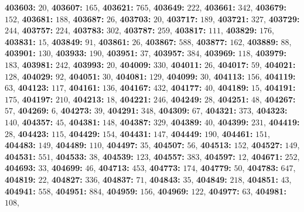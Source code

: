 \textsf{\bfseries 403603:} $20$, \textsf{\bfseries 403607:} $165$, \textsf{\bfseries 403621:} $765$, \textsf{\bfseries 403649:} $222$, \textsf{\bfseries 403661:} $342$, \textsf{\bfseries 403679:} $152$, \textsf{\bfseries 403681:} $188$, \textsf{\bfseries 403687:} $26$, \textsf{\bfseries 403703:} $20$, \textsf{\bfseries 403717:} $189$, \textsf{\bfseries 403721:} $327$, \textsf{\bfseries 403729:} $244$, \textsf{\bfseries 403757:} $224$, \textsf{\bfseries 403783:} $302$, \textsf{\bfseries 403787:} $259$, \textsf{\bfseries 403817:} $111$, \textsf{\bfseries 403829:} $176$, \textsf{\bfseries 403831:} $15$, \textsf{\bfseries 403849:} $91$, \textsf{\bfseries 403861:} $26$, \textsf{\bfseries 403867:} $588$, \textsf{\bfseries 403877:} $162$, \textsf{\bfseries 403889:} $88$, \textsf{\bfseries 403901:} $130$, \textsf{\bfseries 403933:} $190$, \textsf{\bfseries 403951:} $37$, \textsf{\bfseries 403957:} $384$, \textsf{\bfseries 403969:} $118$, \textsf{\bfseries 403979:} $183$, \textsf{\bfseries 403981:} $242$, \textsf{\bfseries 403993:} $20$, \textsf{\bfseries 404009:} $330$, \textsf{\bfseries 404011:} $26$, \textsf{\bfseries 404017:} $59$, \textsf{\bfseries 404021:} $128$, \textsf{\bfseries 404029:} $92$, \textsf{\bfseries 404051:} $30$, \textsf{\bfseries 404081:} $129$, \textsf{\bfseries 404099:} $30$, \textsf{\bfseries 404113:} $156$, \textsf{\bfseries 404119:} $63$, \textsf{\bfseries 404123:} $117$, \textsf{\bfseries 404161:} $136$, \textsf{\bfseries 404167:} $432$, \textsf{\bfseries 404177:} $40$, \textsf{\bfseries 404189:} $15$, \textsf{\bfseries 404191:} $175$, \textsf{\bfseries 404197:} $210$, \textsf{\bfseries 404213:} $18$, \textsf{\bfseries 404221:} $246$, \textsf{\bfseries 404249:} $28$, \textsf{\bfseries 404251:} $48$, \textsf{\bfseries 404267:} $57$, \textsf{\bfseries 404269:} $6$, \textsf{\bfseries 404273:} $39$, \textsf{\bfseries 404291:} $348$, \textsf{\bfseries 404309:} $67$, \textsf{\bfseries 404321:} $373$, \textsf{\bfseries 404323:} $140$, \textsf{\bfseries 404357:} $45$, \textsf{\bfseries 404381:} $148$, \textsf{\bfseries 404387:} $329$, \textsf{\bfseries 404389:} $40$, \textsf{\bfseries 404399:} $231$, \textsf{\bfseries 404419:} $28$, \textsf{\bfseries 404423:} $115$, \textsf{\bfseries 404429:} $154$, \textsf{\bfseries 404431:} $147$, \textsf{\bfseries 404449:} $190$, \textsf{\bfseries 404461:} $151$, \textsf{\bfseries 404483:} $149$, \textsf{\bfseries 404489:} $110$, \textsf{\bfseries 404497:} $35$, \textsf{\bfseries 404507:} $56$, \textsf{\bfseries 404513:} $152$, \textsf{\bfseries 404527:} $149$, \textsf{\bfseries 404531:} $551$, \textsf{\bfseries 404533:} $38$, \textsf{\bfseries 404539:} $123$, \textsf{\bfseries 404557:} $383$, \textsf{\bfseries 404597:} $12$, \textsf{\bfseries 404671:} $252$, \textsf{\bfseries 404693:} $33$, \textsf{\bfseries 404699:} $46$, \textsf{\bfseries 404713:} $453$, \textsf{\bfseries 404773:} $174$, \textsf{\bfseries 404779:} $50$, \textsf{\bfseries 404783:} $647$, \textsf{\bfseries 404819:} $22$, \textsf{\bfseries 404827:} $336$, \textsf{\bfseries 404837:} $71$, \textsf{\bfseries 404843:} $35$, \textsf{\bfseries 404849:} $218$, \textsf{\bfseries 404851:} $43$, \textsf{\bfseries 404941:} $558$, \textsf{\bfseries 404951:} $884$, \textsf{\bfseries 404959:} $156$, \textsf{\bfseries 404969:} $122$, \textsf{\bfseries 404977:} $63$, \textsf{\bfseries 404981:} $108$, 
